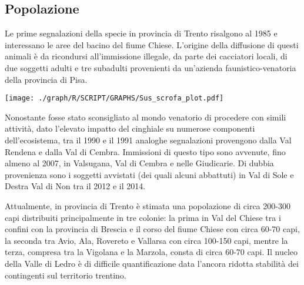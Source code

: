 \begin{multicols}{2}
\section{Popolazione} Le prime segnalazioni della specie in provincia di
Trento risalgono al 1985 e interessano le aree del bacino del fiume
Chiese. L{\textquoteright}origine della diffusione di questi animali
\`e da ricondursi all{\textquoteright}immissione illegale, da parte dei
cacciatori locali, di due soggetti adulti e tre subadulti provenienti
da un{\textquoteright}azienda faunistico-venatoria della provincia di
Pisa.

\begin{Figure}
	\centering
	\texttt{[image: ./graph/R/SCRIPT/GRAPHS/Sus\_scrofa\_plot.pdf]}
\end{Figure}

Nonostante fosse stato sconsigliato al mondo venatorio di
procedere con simili attivit\`a, dato l{\textquoteright}elevato impatto
del cinghiale su numerose componenti dell{\textquoteright}ecosistema,
tra il 1990 e il 1991 analoghe segnalazioni provengono dalla Val
Rendena e dalla Val di Cembra. Immissioni di questo tipo sono avvenute,
fino almeno al 2007, in Valsugana, Val di Cembra e nelle Giudicarie. Di
dubbia provenienza sono i soggetti avvistati (dei quali alcuni
abbattuti) in Val di Sole e Destra Val di Non tra il 2012 e il 2014. 

Attualmente, in provincia di Trento \`e stimata una popolazione di circa
200-300 capi distribuiti principalmente in tre colonie: la prima in Val
del Chiese tra i confini con la provincia di Brescia e il corso del
fiume Chiese con circa 60-70 capi, la seconda tra Avio, Ala, Rovereto e
Vallarsa con circa 100-150 capi, mentre la terza, compresa tra la
Vigolana e la Marzola, consta di circa 60-70 capi. Il nucleo della
Valle di Ledro \`e di difficile quantificazione data
l{\textquoteright}ancora ridotta stabilit\`a dei contingenti sul
territorio trentino. 



\end{multicols}

